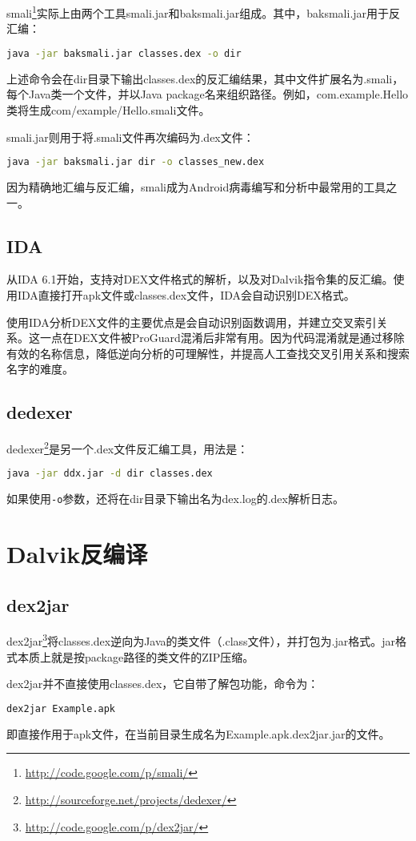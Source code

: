 smali\footnote{\url{http://code.google.com/p/smali/}}实际上由两个工具smali.jar和baksmali.jar组成。其中，baksmali.jar用于反汇编：
\begin{lstlisting}[language=bash, numbers=none]
java -jar baksmali.jar classes.dex -o dir
\end{lstlisting}
上述命令会在dir目录下输出classes.dex的反汇编结果，其中文件扩展名为.smali，每个Java类一个文件，并以Java package名来组织路径。例如，com.example.Hello类将生成com/example/Hello.smali文件。

smali.jar则用于将.smali文件再次编码为.dex文件：
\begin{lstlisting}[language=bash, numbers=none]
java -jar baksmali.jar dir -o classes_new.dex
\end{lstlisting}

因为精确地汇编与反汇编，smali成为Android病毒编写和分析中最常用的工具之一。
\subsection{IDA}
从IDA 6.1开始，支持对DEX文件格式的解析，以及对Dalvik指令集的反汇编。使用IDA直接打开apk文件或classes.dex文件，IDA会自动识别DEX格式。

使用IDA分析DEX文件的主要优点是会自动识别函数调用，并建立交叉索引关系。这一点在DEX文件被ProGuard混淆后非常有用。因为代码混淆就是通过移除有效的名称信息，降低逆向分析的可理解性，并提高人工查找交叉引用关系和搜索名字的难度。
\subsection{dedexer}
dedexer\footnote{\url{http://sourceforge.net/projects/dedexer/}}是另一个.dex文件反汇编工具，用法是：
\begin{lstlisting}[language=bash, numbers=none]
java -jar ddx.jar -d dir classes.dex
\end{lstlisting}
如果使用\lstinline!-o!参数，还将在dir目录下输出名为dex.log的.dex解析日志。
\section{Dalvik反编译}
\subsection{dex2jar}
dex2jar\footnote{\url{http://code.google.com/p/dex2jar/}}将classes.dex逆向为Java的类文件（.class文件），并打包为.jar格式。jar格式本质上就是按package路径的类文件的ZIP压缩。

dex2jar并不直接使用classes.dex，它自带了解包功能，命令为：
\begin{lstlisting}[language=bash, numbers=none]
dex2jar Example.apk
\end{lstlisting}
即直接作用于apk文件，在当前目录生成名为Example.apk.dex2jar.jar的文件。

